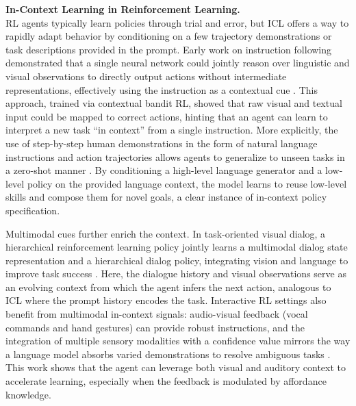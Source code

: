 \documentclass[11pt]{article}
\begin{document}
\textbf{In-Context Learning in Reinforcement Learning.}\\
RL agents typically learn policies through trial and error, but ICL offers a way to rapidly adapt behavior by conditioning on a few trajectory demonstrations or task descriptions provided in the prompt. Early work on instruction following demonstrated that a single neural network could jointly reason over linguistic and visual observations to directly output actions without intermediate representations, effectively using the instruction as a contextual cue \cite{ref147}. This approach, trained via contextual bandit RL, showed that raw visual and textual input could be mapped to correct actions, hinting that an agent can learn to interpret a new task ``in context'' from a single instruction. More explicitly, the use of step-by-step human demonstrations in the form of natural language instructions and action trajectories allows agents to generalize to unseen tasks in a zero-shot manner \cite{ref148}. By conditioning a high-level language generator and a low-level policy on the provided language context, the model learns to reuse low-level skills and compose them for novel goals, a clear instance of in-context policy specification.

Multimodal cues further enrich the context. In task-oriented visual dialog, a hierarchical reinforcement learning policy jointly learns a multimodal dialog state representation and a hierarchical dialog policy, integrating vision and language to improve task success \cite{ref149}. Here, the dialogue history and visual observations serve as an evolving context from which the agent infers the next action, analogous to ICL where the prompt history encodes the task. Interactive RL settings also benefit from multimodal in-context signals: audio-visual feedback (vocal commands and hand gestures) can provide robust instructions, and the integration of multiple sensory modalities with a confidence value mirrors the way a language model absorbs varied demonstrations to resolve ambiguous tasks \cite{ref150}. This work shows that the agent can leverage both visual and auditory context to accelerate learning, especially when the feedback is modulated by affordance knowledge.
\end{document}
